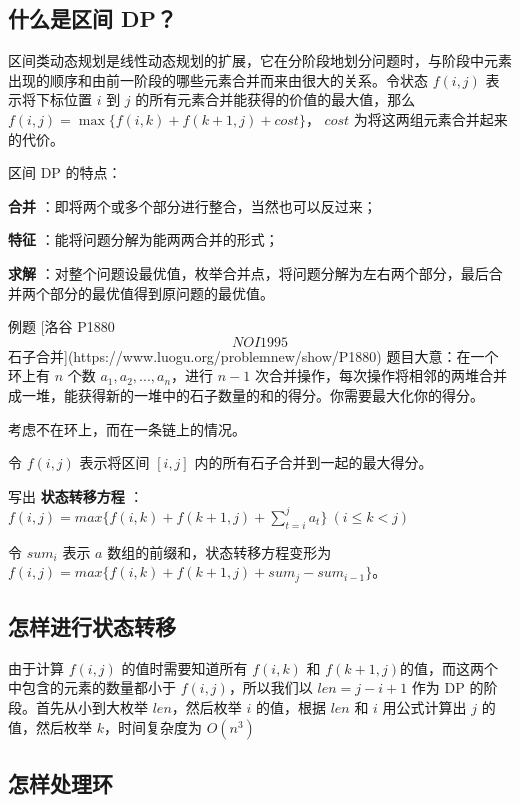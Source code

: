 
\subsection{什么是区间 DP？}

区间类动态规划是线性动态规划的扩展，它在分阶段地划分问题时，与阶段中元素出现的顺序和由前一阶段的哪些元素合并而来由很大的关系。令状态 $f(i,j)$ 表示将下标位置 $i$ 到 $j$ 的所有元素合并能获得的价值的最大值，那么 $f(i,j)=\max\{f(i,k)+f(k+1,j)+cost\}$， $cost$ 为将这两组元素合并起来的代价。

区间 DP 的特点：

\textbf{ 合并 } ：即将两个或多个部分进行整合，当然也可以反过来；

\textbf{ 特征 } ：能将问题分解为能两两合并的形式；

\textbf{ 求解 } ：对整个问题设最优值，枚举合并点，将问题分解为左右两个部分，最后合并两个部分的最优值得到原问题的最优值。

\begin{NOTE}{ 例题 [洛谷 P1880 \[NOI1995\] 石子合并](https://www.luogu.org/problemnew/show/P1880)}{}
题目大意：在一个环上有 $n$ 个数 $a_1,a_2,...,a_n$，进行 $n-1$ 次合并操作，每次操作将相邻的两堆合并成一堆，能获得新的一堆中的石子数量的和的得分。你需要最大化你的得分。
\end{NOTE}


考虑不在环上，而在一条链上的情况。

令 $f(i,j)$ 表示将区间 $[i,j]$ 内的所有石子合并到一起的最大得分。

写出 \textbf{ 状态转移方程 } ： $f(i,j)=max\{f(i,k)+f(k+1,j)+\sum_{t=i}^{j} a_t \}~(i\le k<j)$

令 $sum_i$ 表示 $a$ 数组的前缀和，状态转移方程变形为 $f(i,j)=max\{f(i,k)+f(k+1,j)+sum_j-sum_{i-1} \}$。

\subsection{怎样进行状态转移}

由于计算 $f(i,j)$ 的值时需要知道所有 $f(i,k)$ 和 $f(k+1,j)$的值，而这两个中包含的元素的数量都小于 $f(i,j)$，所以我们以 $len=j-i+1$ 作为 DP 的阶段。首先从小到大枚举 $len$，然后枚举 $i$ 的值，根据 $len$ 和 $i$ 用公式计算出 $j$ 的值，然后枚举 $k$，时间复杂度为 $O(n^3)$

\subsection{怎样处理环}

